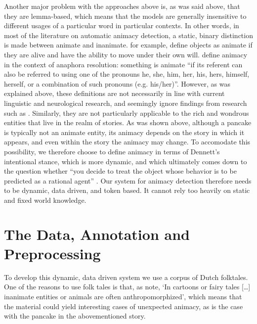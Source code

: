 \documentclass[a4paper,UKenglish]{oasics}
\begin{document}
Another major problem with the approaches above is, as was said above,
that they are lemma-based, which means that the models are generally
insensitive to different usages of a particular word in particular
contexts. In other words, in most of the literature on automatic
animacy detection, a static, binary distinction is made between
animate and inanimate. \cite{bowman:12} for example, define objects as
animate if they are alive and have the ability to move under their own
will. \cite{orasan:07} define animacy in the context of anaphora
resolution: something is animate ``if its referent can also be
referred to using one of the pronouns he, she, him, her, his, hers,
himself, herself, or a combination of such pronouns
(e.g. his/her)''. However, as was explained above, these definitions
are not necessarily in line with current linguistic and neurological
research, and seemingly ignore findings from research such as
\cite{nieuwland:05}. Similarly, they are not particularly applicable
to the rich and wondrous entities that live in the realm of
stories. As was shown above, although a pancake is typically not an
animate entity, its animacy depends on the story in which it appears,
and even within the story the animacy may change. To accomodate this
possibility, we therefore choose to define animacy in terms of
Dennett's intentional stance, which is more dynamic, and which
ultimately comes down to the question whether ``you decide to treat
the object whose behavior is to be predicted as a rational agent''
\cite[pp. 17]{dennett:96}. Our system for animacy detection therefore
needs to be dynamic, data driven, and token based. It cannot rely too
heavily on static and fixed world knowledge.

\section{The Data, Annotation and Preprocessing}\label{sec:data}

To develop this dynamic, data driven system we use a corpus of Dutch
folktales. One of the reasons to use folk tales is that, as
\cite{vogels:13} note, `In cartoons or fairy tales [\ldots] inanimate
entities or animals are often anthropomorphized', which means that the
material could yield interesting cases of unexpected animacy, as is
the case with the pancake in the abovementioned story. 
\end{document}
